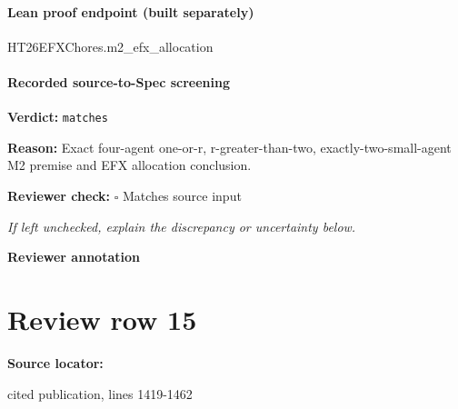 \documentclass[10pt]{article}
\newcommand{\reviewerbox}{%
  \par\noindent\fbox{\parbox{0.96\linewidth}{\rule{0pt}{0.38in}}}\par
}
\newcommand{\reviewmatch}[1]{%
  \par\noindent\textbf{Reviewer check:} $\square$\; #1\par
  \noindent\emph{If left unchecked, explain the discrepancy or uncertainty below.}\par
}
\begin{document}
\paragraph{Lean proof endpoint (built separately)}\begin{ReviewVerbatim}
HT26EFXChores.m2_efx_allocation
\end{ReviewVerbatim}

\paragraph{Recorded source-to-Spec screening}
\textbf{Verdict:} \texttt{matches}
\\
{\raggedright
\textbf{Reason:} Exact four-\allowbreak{}agent one-\allowbreak{}or-\allowbreak{}r, r-\allowbreak{}greater-\allowbreak{}than-\allowbreak{}two, exactly-\allowbreak{}two-\allowbreak{}small-\allowbreak{}agent M2 premise and EFX allocation conclusion.\allowbreak{}
\par}
\reviewmatch{Matches source input}
\noindent\textbf{Reviewer annotation}\par
\reviewerbox
\clearpage
\hypertarget{source-claim-687ed4b91a799ce3}{}
\section*{Review row 15}
\textbf{Source locator:} {\footnotesize\raggedright cited publication, lines 1419-\allowbreak{}1462\par}
\end{document}
